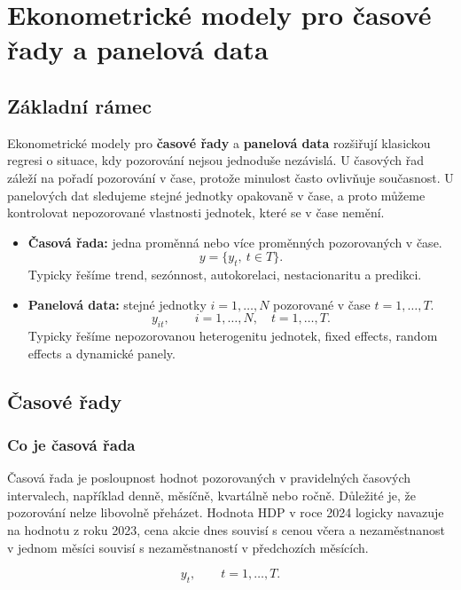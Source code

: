 \section{Ekonometrické modely pro časové řady a panelová data}

\subsection{Základní rámec}

Ekonometrické modely pro \textbf{časové řady} a \textbf{panelová data} rozšiřují klasickou regresi o situace,
kdy pozorování nejsou jednoduše nezávislá. U časových řad záleží na pořadí pozorování v čase,
protože minulost často ovlivňuje současnost. U panelových dat sledujeme stejné jednotky opakovaně
v čase, a proto můžeme kontrolovat nepozorované vlastnosti jednotek, které se v čase nemění.

\begin{itemize}
    \item \textbf{Časová řada:} jedna proměnná nebo více proměnných pozorovaných v čase.
    \[
        y=\{y_t,\ t\in T\}.
    \]
    Typicky řešíme trend, sezónnost, autokorelaci, nestacionaritu a predikci.

    \item \textbf{Panelová data:} stejné jednotky $i=1,\dots,N$ pozorované v čase $t=1,\dots,T$.
    \[
        y_{it}, \qquad i=1,\dots,N,\quad t=1,\dots,T.
    \]
    Typicky řešíme nepozorovanou heterogenitu jednotek, fixed effects, random effects a dynamické panely.
\end{itemize}

\subsection{Časové řady}

\subsubsection{Co je časová řada}

Časová řada je posloupnost hodnot pozorovaných v pravidelných časových intervalech, například denně,
měsíčně, kvartálně nebo ročně. Důležité je, že pozorování nelze libovolně přeházet. Hodnota HDP v roce
2024 logicky navazuje na hodnotu z roku 2023, cena akcie dnes souvisí s cenou včera a nezaměstnanost
v jednom měsíci souvisí s nezaměstnaností v předchozích měsících.

\[
    y_t,\qquad t=1,\dots,T.
\]

